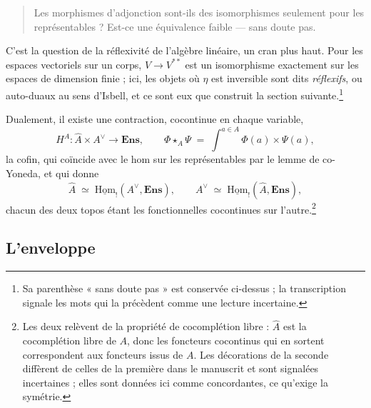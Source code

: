 \documentclass[11pt,a4paper]{article}
\begin{document}
\begin{quote}
Les morphismes d'adjonction sont-ils des isomorphismes seulement pour les
représentables ? Est-ce une équivalence faible — sans doute pas.
\end{quote}

C'est la question de la réflexivité de l'algèbre linéaire, un cran plus haut.
Pour les espaces vectoriels sur un corps, $V \to V^{**}$ est un isomorphisme
exactement sur les espaces de dimension finie ; ici, les objets où $\eta$ est
inversible sont dits \emph{réflexifs}, ou auto-duaux au sens d'Isbell, et ce
sont eux que construit la section suivante.\footnote{Sa parenthèse « sans
doute pas » est conservée ci-dessus ; la transcription signale les mots qui la
précèdent comme une lecture incertaine.}

Dualement, il existe une contraction, cocontinue en chaque variable,
\[
H^{A} : \widehat{A} \times A^{\vee} \longrightarrow \mathbf{Ens},
\qquad
\Phi \star_{A} \Psi \;=\; \int^{a \in A} \Phi(a) \times \Psi(a),
\]
la cofin, qui coïncide avec le hom sur les représentables par le lemme de
co-Yoneda, et qui donne
\[
\widehat{A} \;\simeq\; \underline{\mathrm{Hom}}_{!}(A^{\vee}, \mathbf{Ens}),
\qquad
A^{\vee} \;\simeq\; \underline{\mathrm{Hom}}_{!}(\widehat{A}, \mathbf{Ens}),
\]
chacun des deux topos étant les fonctionnelles cocontinues sur
l'autre.\footnote{Les deux relèvent de la propriété de cocomplétion libre :
$\widehat{A}$ est la cocomplétion libre de $A$, donc les foncteurs cocontinus
qui en sortent correspondent aux foncteurs issus de $A$. Les décorations de la
seconde diffèrent de celles de la première dans le manuscrit et sont signalées
incertaines ; elles sont données ici comme concordantes, ce qu'exige la
symétrie.}

\subsection*{L'enveloppe}
\end{document}
